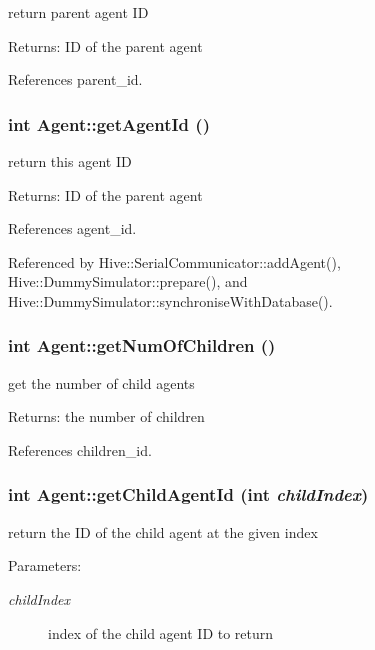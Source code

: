 return parent agent ID \begin{Desc}
\item[Returns:]ID of the parent agent \end{Desc}


References parent\_\-id.
\subsubsection[getAgentId]{\setlength{\rightskip}{0pt plus 5cm}int Agent::getAgentId ()}\label{classHive_1_1Agent_3b6ebc7294216a2f8e7e0d4cbfdfd33b}


return this agent ID \begin{Desc}
\item[Returns:]ID of the parent agent \end{Desc}


References agent\_\-id.

Referenced by Hive::SerialCommunicator::addAgent(), Hive::DummySimulator::prepare(), and Hive::DummySimulator::synchroniseWithDatabase().
\subsubsection[getNumOfChildren]{\setlength{\rightskip}{0pt plus 5cm}int Agent::getNumOfChildren ()}\label{classHive_1_1Agent_9b67da3082d21e119943e0ff43642b56}


get the number of child agents \begin{Desc}
\item[Returns:]the number of children \end{Desc}


References children\_\-id.
\subsubsection[getChildAgentId]{\setlength{\rightskip}{0pt plus 5cm}int Agent::getChildAgentId (int {\em childIndex})}\label{classHive_1_1Agent_7ad69e92da1d4dcee56680f3da3aba66}


return the ID of the child agent at the given index \begin{Desc}
\item[Parameters:]
\begin{description}
\item[{\em childIndex}]index of the child agent ID to return \end{description}
\end{Desc}


